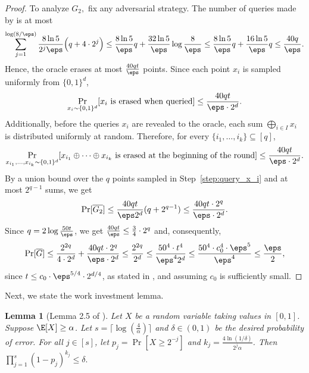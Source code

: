 \documentclass[11pt]{article}
\numberwithin{equation}{section}
\newtheorem{lemma}[theorem]{Lemma}
\theoremstyle{definition}
\theoremstyle{plain}
\begin{document}
\begin{proof}
To analyze $G_2,$ fix any adversarial strategy. The number of queries made by  is at most 
\begin{equation}\label{eq:num-queries}
    \sum_{j=1}^{ \log(8/\eps) } \frac{8\ln 5}{2^j \eps} \Big(q + 4 \cdot 2^j \Big) \leq \frac{8\ln 5}{\eps} q + \frac{32 \ln 5}{\eps} \log\frac 8\eps \leq \frac{8\ln 5}{\eps} q + \frac{16 \ln 5}{\eps}q \leq \frac{40 q}{\eps }.
\end{equation}
Hence, the oracle erases at most $ \frac{40qt}{\eps}$ points. Since each point $x_i$ is sampled uniformly from $\{0,1\}^d$,
\begin{equation*}
    \Pr_{x_i \sim \{0,1\}^d} [x_i \textnormal{ is erased when queried}] \leq  \frac{40qt}{\eps\cdot 2^d}.
\end{equation*}
Additionally, before the queries $x_i$ are revealed to the oracle, each sum $\bigoplus_{i \in I}x_i$ is distributed uniformly at random. Therefore, for every $\{i_1, \dots, i_k\} \subseteq [q]$,
\begin{equation*}
    \Pr_{x_{i_1}, \dots,  x_{i_{k}} \sim \{0,1\}^d} [x_{i_1} \oplus \dots \oplus x_{i_{k}} \textnormal{ is erased at the beginning of the round}] \leq \frac{40qt}{\eps\cdot 2^d}.
\end{equation*}
By a union bound over the $q$ points sampled in Step~\ref{step:query_x_i} and at most $2^{q-1}$ sums, we get 
\[
\Pr[\overline{G_2}] \leq  \frac{40qt}{\eps  2^d}(q+2^{q-1}) \leq  \frac{40  qt \cdot 2^q }{\eps \cdot   2^d}.
\]
Since $q = 2\log\frac{50t}\eps$, we get  $\frac{40qt}{\eps} \leq \frac{3}{4} \cdot 2^q$ and, consequently,
\begin{align*}
     \Pr[\overline{G}] \leq \frac{2^{2q}}{4 \cdot 2^d} + \frac{40qt\cdot 2^q }{\eps \cdot  2^d}  
     \leq \frac{ 2^{2q}}{2^d} \leq \frac{ 50^4 \cdot t^4}{\eps^4 2^d} \leq \frac{50^4 \cdot c_0^4 \cdot \eps^5}{\eps^4} \leq \frac{\eps}{2},
\end{align*}
since $t \leq c_0 \cdot \eps^{5/4} \cdot 2^{d/4}$, as stated in , and assuming $c_0$ is sufficiently small.
\end{proof}

Next, we state the work investment lemma.
\begin{lemma}[Lemma 2.5 of \cite{BermanRY14}] \label{lem:work}
Let $X$ be a random variable taking values in $[0,1]$. Suppose $\E[X] \geq \alpha$. Let $s = \lceil \log(\frac{4}{\alpha}) \rceil$ and $\delta \in (0,1)$ be the desired probability of error. For all $j \in [s]$, let $p_j = \Pr[X \geq 2^{-j}]$ and $k_j =  \frac{4\ln(1/\delta)}{2^j\alpha}$. Then
$
    \prod_{j=1}^{s}(1-p_j)^{k_j} \leq \delta.
$
\end{lemma}
\end{document}
